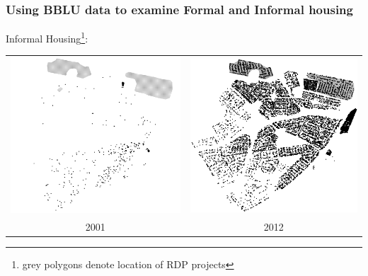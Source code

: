 \documentclass[aspectratio=149]{beamer}
\begin{document}

\begin{frame}
\frametitle{Using BBLU data to examine Formal and Informal housing}

Informal Housing\footnote{grey polygons denote location of RDP projects}:

\vspace{4mm}

\begin{tabular}{cc}
 \includegraphics[scale=0.18]{pre_informal.png} & \includegraphics[scale=0.18]{post_informal.png} \\
  2001 & 2012 \\
\end{tabular}

\end{frame}
\end{document}
